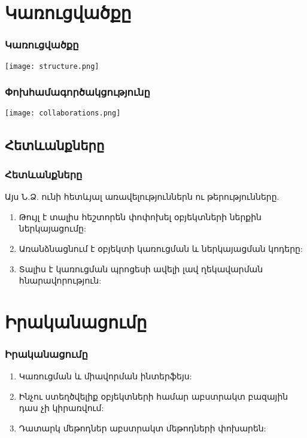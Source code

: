 \documentclass{beamer}
\begin{document}
\section{Կառուցվածքը}
\begin{frame}\frametitle{Կառուցվածքը}
\begin{center}
    \texttt{[image: structure.png]}
\end{center}
\end{frame}

\begin{frame}\frametitle{Փոխհամագործակցությունը}
\begin{center}
    \texttt{[image: collaborations.png]}
\end{center}
\end{frame}

\subsection{Հետևանքները}
\begin{frame}\frametitle{Հետևանքները}
Այս Ն.Ձ. ունի հետևյալ առավելություններն ու թերությունները.
\vfill
\begin{enumerate}
    \item Թույլ է տալիս հեշտորեն փոփոխել օբյեկտների ներքին ներկայացումը: \pause \vfill
    \item Առանձնացնում է օբյեկտի կառուցման և ներկայացման կոդերը: \pause \vfill
    \item Տալիս է կառուցման պրոցեսի ավելի լավ ղեկավարման հնարավորություն:
\end{enumerate}
\end{frame}

\section{Իրականացումը}
\begin{frame}\frametitle{Իրականացումը}
\begin{enumerate}
    \item Կառուցման և միավորման ինտերֆեյս: \pause \vfill
    \item Ինչու ստեղծվելիք օբյեկտների համար աբստրակտ բազային դաս չի կիրառվում: \pause \vfill
    \item Դատարկ մեթոդներ աբստրակտ մեթոդների փոխարեն:
\end{enumerate}
\end{frame}
\end{document}
